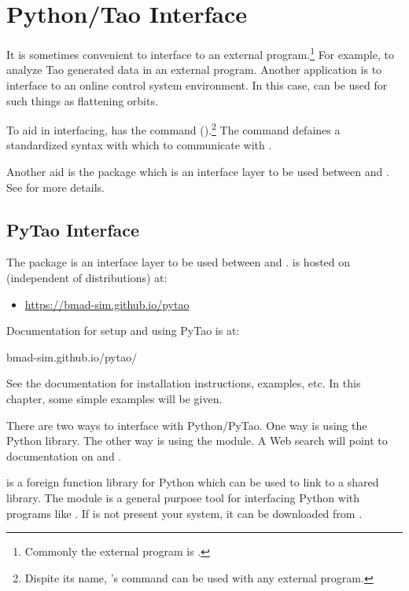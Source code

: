 \chapter{Python/Tao Interface}
\label{c:python}

It is sometimes convenient to interface \tao to an external program.\footnote
  { 
Commonly the external program is . 
  }
For example, to analyze Tao generated data in an external program. Another application is to
interface \tao to an online control system environment. In this case, \tao can be used for such
things as flattening orbits.

To aid in interfacing, \tao has the  command ().\footnote
  {
Dispite its name, \tao's  command can be used with any external program. 
  }
The  command defaines a standardized syntax with which to communicate with \tao.

Another aid is the  package which is an interface layer to be used between \tao and
. See  for more details.

\section{PyTao Interface}
\label{s:pytao}

The  package is an interface layer to be used between \tao and
.  is hosted on 
(independent of \bmad distributions) at:
\vspace{-2ex}
\begin{itemize}
  \item[] \url{https://bmad-sim.github.io/pytao}
\end{itemize}
\vspace{-2ex}
Documentation for setup and using PyTao is at:
\begin{example}
  bmad-sim.github.io/pytao/
\end{example}
See the  documentation for installation instructions, examples, etc. In this chapter, some
simple examples will be given.

There are two ways to interface with Python/PyTao. One way is using the Python 
library. The other way is using the  module. A Web search will point to documentation on
 and . 

 is a foreign function library for Python which can be used to link to a \tao shared
library.  The  module is a general purpose tool for interfacing Python with programs
like \tao. If  is not present your system, it can be downloaded from
.

